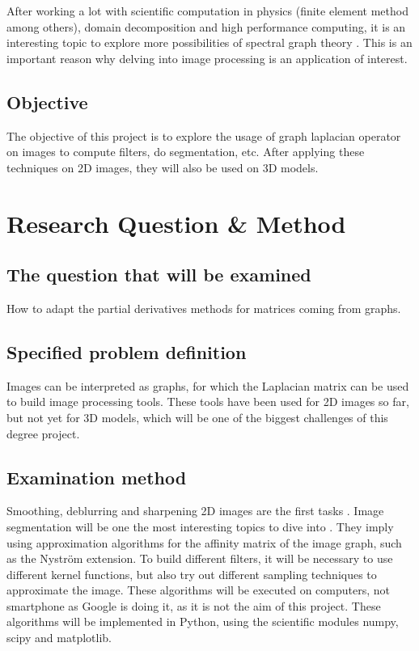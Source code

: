 \documentclass[12pt]{article}
\begin{document}
After working a lot with scientific computation in physics (finite element method among others), domain decomposition and high performance computing, it is an interesting topic to explore more possibilities of spectral graph theory \cite{ddm_nataf_2015}.
This is an important reason why delving into image processing is an application of interest.

\subsection*{Objective}

The objective of this project is to explore the usage of graph laplacian operator on images to compute filters, do segmentation, etc.
After applying these techniques on 2D images, they will also be used on 3D models.

\section*{Research Question \& Method}

\subsection*{The question that will be examined}

How to adapt the partial derivatives methods for matrices coming from graphs.

\subsection*{Specified problem definition}

Images can be interpreted as graphs, for which the Laplacian matrix can be used to build image processing tools.
These tools have been used for 2D images so far, but not yet for 3D models, which will be one of the biggest challenges of this degree project.

\subsection*{Examination method}

Smoothing, deblurring and sharpening 2D images are the first tasks \cite{modern_tour_2013} \cite{glide_2014}.
Image segmentation will be one the most interesting topics to dive into \cite{tolliver_spectral_2006} \cite{felzenszwalb_efficient_2004}.
They imply using approximation algorithms for the affinity matrix of the image graph, such as the Nystr\"om extension.
To build different filters, it will be necessary to use different kernel functions, but also try out different sampling techniques to approximate the image.
These algorithms will be executed on computers, not smartphone as Google is doing it, as it is not the aim of this project.
These algorithms will be implemented in Python, using the scientific modules numpy, scipy and matplotlib.
\end{document}
